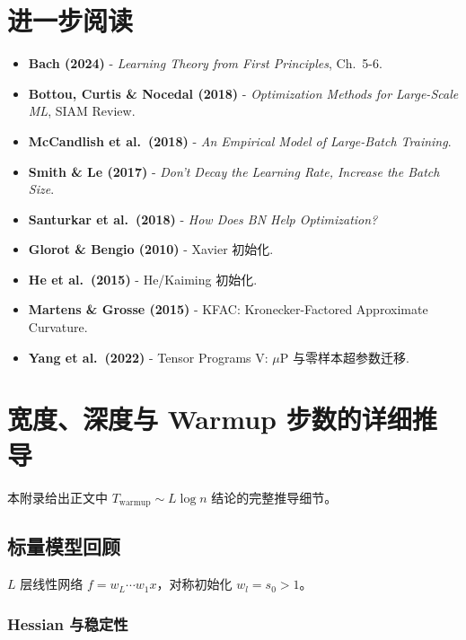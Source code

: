 \documentclass[12pt, a4paper]{ctexart}
\begin{document}
\section*{进一步阅读}

\begin{itemize}
    \item \textbf{Bach (2024)} - \textit{Learning Theory from First Principles}, Ch.\ 5-6.
    \item \textbf{Bottou, Curtis \& Nocedal (2018)} - \textit{Optimization Methods for Large-Scale ML}, SIAM Review.
    \item \textbf{McCandlish et al.\ (2018)} - \textit{An Empirical Model of Large-Batch Training}.
    \item \textbf{Smith \& Le (2017)} - \textit{Don't Decay the Learning Rate, Increase the Batch Size}.
    \item \textbf{Santurkar et al.\ (2018)} - \textit{How Does BN Help Optimization?}
    \item \textbf{Glorot \& Bengio (2010)} - Xavier 初始化.
    \item \textbf{He et al.\ (2015)} - He/Kaiming 初始化.
    \item \textbf{Martens \& Grosse (2015)} - KFAC: Kronecker-Factored Approximate Curvature.
    \item \textbf{Yang et al.\ (2022)} - Tensor Programs V: $\mu$P 与零样本超参数迁移.
\end{itemize}

\appendix

\section{宽度、深度与 Warmup 步数的详细推导}
\label{app:warmup}

本附录给出正文中 $T_{\text{warmup}} \sim L\log n$ 结论的完整推导细节。

\subsection{标量模型回顾}

$L$ 层线性网络 $f = w_L \cdots w_1 x$，对称初始化 $w_l = s_0 > 1$。

\subsubsection{Hessian 与稳定性}
\end{document}
